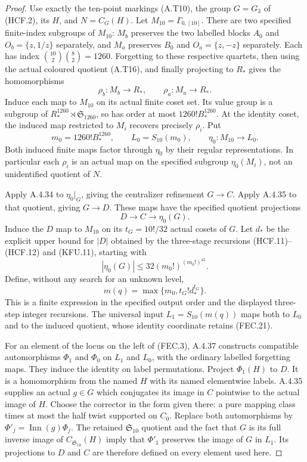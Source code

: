 \begin{proof}
Use exactly the ten-point markings (A.T10), the
group $G=G_3$ of (HCF.2), its $H$, and
$N=C_G(H)$.  Let $M_{10}=\Gamma_{0,[10]}$.
There are two specified finite-index subgroups of
$M_{10}$: $M_b$ preserves the two labelled blocks
$A_0$ and $O_b=\{z,1/z\}$ separately, and $M_a$
preserves $B_0$ and $O_a=\{z,-z\}$ separately.
Each has index
$\binom{10}{2}\binom82=1260$.
Forgetting to these respective quartets, then using
the actual coloured quotient (A.T16), and finally
projecting to $R_*$ gives the homomorphisms
\[
       \rho_b:M_b\longrightarrow R_* ,\qquad
       \rho_a:M_a\longrightarrow R_* .
                                                               \tag{FEC.19}
\]
Induce each map to $M_{10}$ on its actual finite
coset set.  Its value group is a subgroup of
$R_*^{1260}\rtimes\mathfrak S_{1260}$, so has order
at most $1260! B_*^{1260}$.  At the identity coset,
the induced map restricted to $M_i$ recovers precisely
$\rho_i$.  Put
\[
 m_0=1260! B_*^{1260},\qquad
 L_0=S_{10}(m_0),\qquad \eta_0:M_{10}\to L_0.
                                                               \tag{FEC.20}
\]
Both induced finite maps factor through $\eta_0$ by
their regular representations.  In particular each
$\rho_i$ is an actual map on the specified subgroup
$\eta_0(M_i)$, not an unidentified quotient of $N$.

Apply A.4.34 to $\eta_0|_G$, giving the centralizer
refinement $G\to C$.  Apply A.4.35 to that quotient,
giving $G\to D$.  These maps have the specified
quotient projections
\[
                 D\longrightarrow C\longrightarrow \eta_0(G).
                                                               \tag{FEC.21}
\]
Induce the $D$ map to $M_{10}$ on its
$t_G=10!/32$ actual cosets of $G$.  Let $d_*$ be
the explicit upper bound for $|D|$ obtained by the
three-stage recursions (HCF.11)--(HCF.12) and
(KFU.11), starting with
\[
 |\eta_0(G)|\leq32(m_0!)^{(m_0!)^{45}}.
\]
Define, without any search for an unknown level,
\[
                  m(q)=\max\{m_0,t_G!d_*^{t_G}\}.
                                                               \tag{FEC.22}
\]
This is a finite expression in the specified output
order and the displayed three-step integer recursions.
The universal input $L_1=S_{10}(m(q))$ maps both
to $L_0$ and to the induced quotient, whose identity
coordinate retains (FEC.21).

For an element of the locus on the left of (FEC.3),
A.4.37 constructs compatible automorphisms $\Phi_1$
and $\Phi_0$ on $L_1$ and $L_0$, with the ordinary
labelled forgetting maps.  They induce the identity
on label permutations.  Project $\Phi_1(H)$ to $D$.
It is a homomorphism from the named $H$ with its
named elementwise labels.  A.4.35 supplies an actual
$g\in G$ which conjugates its image in $C$ pointwise
to the actual image of $H$.  Choose the corrector in
the form given there: a pure mapping class times at
most the half twist supported on $C_0$.
Replace both automorphisms by
$\Phi'_j=\operatorname{Inn}(g)\Phi_j$.
The retained $\mathfrak S_{10}$ quotient and the fact
that $G$ is its full inverse image of
$C_{\mathfrak S_{10}}(H)$ imply that $\Phi'_1$
preserves the image of $G$ in $L_1$.  Its projections
to $D$ and $C$ are therefore defined on every element
used here.


\end{proof}
